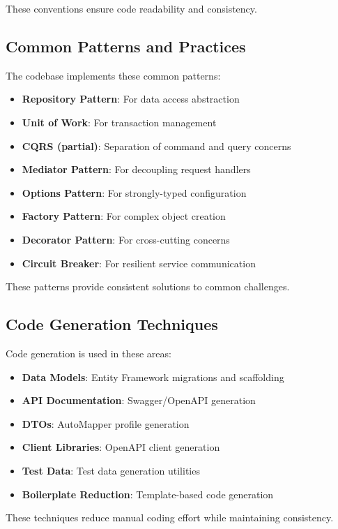 These conventions ensure code readability and consistency.

\subsection{Common Patterns and Practices}
The codebase implements these common patterns:
\begin{itemize}
    \item \textbf{Repository Pattern}: For data access abstraction
    \item \textbf{Unit of Work}: For transaction management
    \item \textbf{CQRS (partial)}: Separation of command and query concerns
    \item \textbf{Mediator Pattern}: For decoupling request handlers
    \item \textbf{Options Pattern}: For strongly-typed configuration
    \item \textbf{Factory Pattern}: For complex object creation
    \item \textbf{Decorator Pattern}: For cross-cutting concerns
    \item \textbf{Circuit Breaker}: For resilient service communication
\end{itemize}

These patterns provide consistent solutions to common challenges.

\subsection{Code Generation Techniques}
Code generation is used in these areas:
\begin{itemize}
    \item \textbf{Data Models}: Entity Framework migrations and scaffolding
    \item \textbf{API Documentation}: Swagger/OpenAPI generation
    \item \textbf{DTOs}: AutoMapper profile generation
    \item \textbf{Client Libraries}: OpenAPI client generation
    \item \textbf{Test Data}: Test data generation utilities
    \item \textbf{Boilerplate Reduction}: Template-based code generation
\end{itemize}

These techniques reduce manual coding effort while maintaining consistency.

